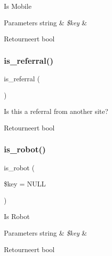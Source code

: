 Is Mobile


\begin{DoxyParams}[1]{Parameters}
string & {\em \$key} & \\
\hline
\end{DoxyParams}
\begin{DoxyReturn}{Retourneert}
bool 
\end{DoxyReturn}
\mbox{\label{class_c_i___user__agent_ab2ec679c069f45c4265dade1e1097f17}} 
\subsubsection{\texorpdfstring{is\_referral()}{is\_referral()}}
{\footnotesize\ttfamily is\+\_\+referral (\begin{DoxyParamCaption}{ }\end{DoxyParamCaption})}

Is this a referral from another site?

\begin{DoxyReturn}{Retourneert}
bool 
\end{DoxyReturn}
\mbox{\label{class_c_i___user__agent_aaf9eed8184635473476a24f6a850815c}} 
\subsubsection{\texorpdfstring{is\_robot()}{is\_robot()}}
{\footnotesize\ttfamily is\+\_\+robot (\begin{DoxyParamCaption}\item[{}]{\$key = {\ttfamily NULL} }\end{DoxyParamCaption})}

Is Robot


\begin{DoxyParams}[1]{Parameters}
string & {\em \$key} & \\
\hline
\end{DoxyParams}
\begin{DoxyReturn}{Retourneert}
bool 
\end{DoxyReturn}
\mbox{\label{class_c_i___user__agent_adda8fc15b6fe0efc05a50d2645189c77}} 
